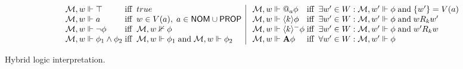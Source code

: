 \documentclass{eptcs}
\newcommand{\E}[1]{\langle{#1}\rangle}
\newcounter{ti}
\begin{document}
\begin{table}[ht]
\small
$$
\begin{array}{ l @{\; {\mathcal M}, w \Vdash \;} l @{\; \text{iff} \; \; } l}
& \top & true \\
& a & w \in V(a), \; a \in \textsf{NOM} \cup \textsf{PROP} \\
& \neg \phi & {\mathcal M}, w \nVdash \phi\\
& \phi_1 \land \phi_2 & {\mathcal M}, w \Vdash \phi_1 \; \text{and} \; {\mathcal M}, w \Vdash \phi_2 \\
\end{array}
\vrule
\begin{array}{ l @{\; {\mathcal M}, w \Vdash \;} l @{\; \text{iff} \; \; } l}
& @_a \phi & \exists w' \in W: {\mathcal M}, w' \Vdash \phi\;\text{and}\; \{w'\} = V(a) \\
& \E{k}\phi & \exists w' \in W: {\mathcal M}, w' \Vdash \phi \; \text{and}\; w R_k w' \\
& \E{k}^- \phi & \exists w' \in W: {\mathcal M}, w' \Vdash \phi \; \text{and}\; w' R_k w \\
& \textbf {A} \phi & \forall w' \in W: {\mathcal M}, w' \Vdash \phi \\
\end{array}
$$
\label{tab:hybrid}
\caption{Hybrid logic interpretation.}
\end{table}
\end{document}
